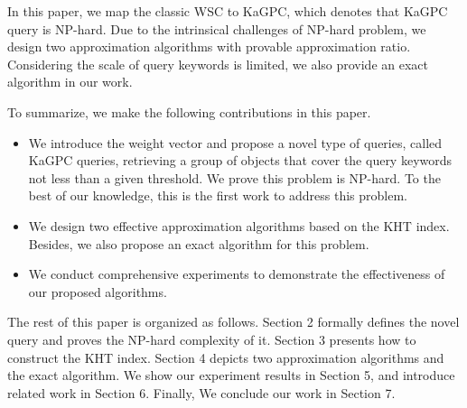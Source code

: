 In this paper, we map the classic WSC to KaGPC, which denotes that KaGPC query is NP-hard. Due to the intrinsical challenges of NP-hard problem, we design two approximation algorithms with provable approximation ratio. Considering the scale of query keywords is limited, we also provide an exact algorithm in our work.

To summarize, we make the following contributions in this paper.
\begin{itemize}
    \item We introduce the weight vector and propose a novel type of queries, called KaGPC queries, retrieving a group of objects that cover the query keywords not less than a given threshold. We prove this problem is NP-hard. To the best of our knowledge, this is the first work to address this problem.
    \item We design two effective approximation algorithms based on the KHT index. Besides, we also propose an exact algorithm for this problem.
    \item We conduct comprehensive experiments to demonstrate the effectiveness of our proposed algorithms.
\end{itemize}

The rest of this paper is organized as follows. Section 2 formally defines the novel query and proves the NP-hard complexity of it. Section 3 presents how to construct the KHT index. Section 4 depicts two approximation algorithms and the exact algorithm. We show our experiment results in Section 5, and introduce related work in Section 6. Finally, We conclude our work in Section 7.

